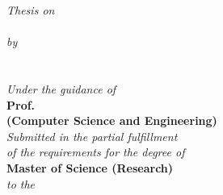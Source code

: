 \begin{titlepage}
\begin{center}
{\large {\textit{Thesis on}}}\\
\Large{\textbf{ \ThesisTitle}}\\
\vspace{15pt}
\normalsize \emph {by}\\
\vspace{15pt}
\Large{\textbf{\Auth}} \\
\normalsize{\textsf{\bf \Entry}}\\
\vspace{25pt}
{\normalsize \emph {Under the guidance of}} \\
\Large{\textbf{Prof. \Guide{}}} \\
\normalsize{\textsf{\bf (Computer Science and Engineering)\\ }}
\vspace{20pt}
{\normalsize \emph {Submitted in the partial fulfillment \\of the requirements for the degree of}}\\
\vspace{10pt}
{\large \textbf{Master of Science (Research)}}\\

\vspace{15pt}
{\normalsize \emph {to the}}

\vspace{10pt}


\end{center}
\end{titlepage}
